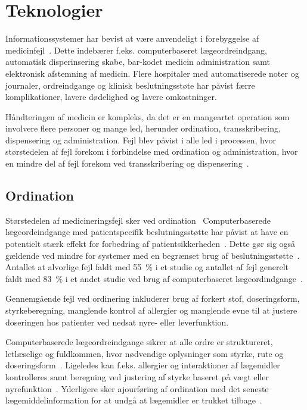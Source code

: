 \chapter{Teknologier}
Informationssystemer har bevist at være anvendeligt i forebyggelse af medicinfejl~\citep{Agrawal2009, Anderson2002}. Dette indebærer f.eks. computerbaseret lægeordreindgang, automatisk disperinsering skabe, bar-kodet medicin administration samt elektronisk afstemning af medicin. Flere hospitaler med automatiserede noter og journaler, ordreindgange og klinisk beslutningsstøte har påvist færre komplikationer, lavere dødelighed og lavere omkostninger.  

Håndteringen af medicin er kompleks, da det er en mangeartet operation som involvere flere personer og mange led, herunder ordination, transskribering, dispensering og administration.  Fejl blev påvist i alle led i processen, hvor størstedelen af fejl forekom i forbindelse med ordination og administration, hvor en mindre del af fejl forekom ved transskribering og dispensering~\citep{Agrawal2009,Anderson2002}.

\section{Ordination}
Størstedelen af medicineringsfejl sker ved ordination~\citep{Agrawal2009,Anderson2002,Kaushal2002}
Computerbaserede lægeordeindgange med patientspecifik beslutningsstøtte har påvist at have en potentielt stærk effekt for forbedring af patientsikkerheden~\citep{Agrawal2009, Bates2000a}. Dette gør sig også gældende ved mindre for systemer med en begrænset brug af beslutningsstøtte~\citep{Bates2000a}. Antallet at alvorlige fejl faldt med 55~\% i et studie og antallet af fejl generelt faldt med 83~\% i et andet studie ved brug af computerbaseret lægeordindgange~\citep{Bates2000a}. 

Gennemgående fejl ved ordinering inkluderer brug af forkert stof, doseringsform, styrkeberegning, manglende kontrol af allergier og manglende evne til at justere doseringen hos patienter ved nedsat nyre- eller leverfunktion.~\citep{Agrawal2009} 

Computerbaserede lægeordreindgange sikrer at alle ordre er struktureret, letlæselige og fuldkommen, hvor nødvendige oplysninger som styrke, rute og doseringsform~\citep{Agrawal2009,Bates2000a}. Ligeledes kan f.eks. allergier og interaktioner af lægemidler kontrolleres samt beregning ved justering af styrke baseret på vægt eller nyrefunktion~\citep{Agrawal2009}. Yderligere sker ajourføring af ordination med det seneste lægemiddelinformation for at undgå at lægemidler er trukket tilbage~\citep{Agrawal2009}.

